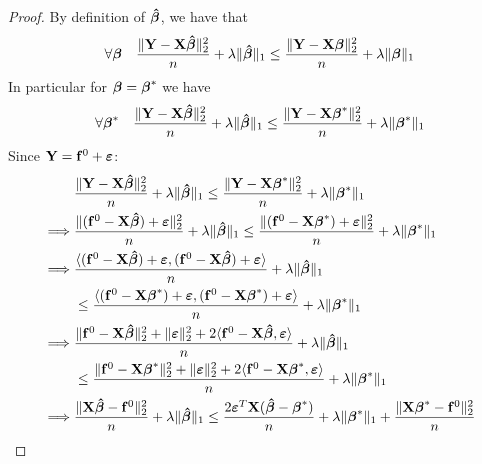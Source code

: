 \begin{proof}
    By definition of $\boldsymbol{\hat{\beta}}$, we have that
    $$
        \forall \boldsymbol{\beta} \quad \frac{\| \mathbf{Y} -\mathbf{X} \boldsymbol{\hat{\beta}} \|_{2}^{2}}{n} + \lambda \| \boldsymbol{\hat{\beta}} \|_{1} \leq \frac{\|\mathbf{Y}-\mathbf{X} \boldsymbol{\beta} \|_{2}^{2}}{n}+\lambda \| \boldsymbol{\beta} \|_{1}
    $$
    In particular for $\boldsymbol{\beta} = \boldsymbol{\beta}^*$ we have
    $$
        \forall \boldsymbol{\beta}^* \quad \frac{\| \mathbf{Y} -\mathbf{X} \boldsymbol{\hat{\beta}} \|_{2}^{2}}{n} + \lambda \| \boldsymbol{\hat{\beta}} \|_{1} \leq \frac{\|\mathbf{Y}-\mathbf{X} \boldsymbol{\beta}^* \|_{2}^{2}}{n}+\lambda \| \boldsymbol{\beta}^* \|_{1}
    $$
    Since $\mathbf{Y} = \mathbf{f}^0 + \boldsymbol{\varepsilon}$:
    \begin{align*}
                 & \frac{\|\mathbf{Y}  - \mathbf{X} \boldsymbol{\hat{\beta}} \|_{2}^{2}}{n} + \lambda \| \boldsymbol{\hat{\beta}}\|_{1} \leq \frac{\| \mathbf{Y}  - \mathbf{X} \boldsymbol{\beta}^* \|_2^2}{n}+\lambda\|\boldsymbol{\beta}^{*}\|_{1}                                                                     \\
        \implies &
        \frac{\| (\mathbf{f}^0 - \mathbf{X} \boldsymbol{\hat{\beta}} ) + \boldsymbol{\varepsilon} \|_{2}^{2}}{n} + \lambda\| \boldsymbol{\hat{\beta}} \|_{1} \leq \frac{ \| (\mathbf{f}^0 - \mathbf{X} \boldsymbol{\beta}^*) + \boldsymbol{\varepsilon} \|_{2}^{2}}{n}+\lambda \| \boldsymbol{\beta}^*\|_{1}                                     \\
        \implies &
        \frac{\langle (\mathbf{f}^0 - \mathbf{X} \boldsymbol{\hat{\beta}} ) + \boldsymbol{\varepsilon}, (\mathbf{f}^0 - \mathbf{X} \boldsymbol{\hat{\beta}} ) + \boldsymbol{\varepsilon} \rangle}{n} + \lambda\| \boldsymbol{\hat{\beta}} \|_{1}                                                                                      \\
                 & \leq \frac{ \langle (\mathbf{f}^0 - \mathbf{X} \boldsymbol{\beta}^*) + \boldsymbol{\varepsilon}, (\mathbf{f}^0 - \mathbf{X} \boldsymbol{\beta}^*) + \boldsymbol{\varepsilon} \rangle}{n}+\lambda \| \boldsymbol{\beta}^*\|_{1}                                                                            \\
        \implies &
        \frac{\|\mathbf{f}^0 - \mathbf{X} \boldsymbol{\hat{\beta}} \|_{2}^{2} + \| \boldsymbol{\varepsilon} \|_{2}^{2} + 2\langle \mathbf{f}^0 - \mathbf{X} \boldsymbol{\hat{\beta}}, \boldsymbol{\varepsilon} \rangle}{n} + \lambda\| \boldsymbol{\hat{\beta}} \|_{1}                                                                \\
                 & \leq \frac{\|\mathbf{f}^0 - \mathbf{X} \boldsymbol{\beta}^* \|_{2}^{2} + \| \boldsymbol{\varepsilon} \|_{2}^{2} + 2\langle \mathbf{f}^0 - \mathbf{X} \boldsymbol{\beta}^*, \boldsymbol{\varepsilon} \rangle}{n}+\lambda \| \boldsymbol{\beta}^*\|_{1}                                                     \\
        \implies &
        \frac{\|\mathbf{X} \boldsymbol{\hat{\beta}} - \mathbf{f}^0 \|_{2}^{2}}{n} + \lambda\| \boldsymbol{\hat{\beta}} \|_{1} \leq \frac{2 \boldsymbol{\varepsilon}^T \mathbf{X} (\boldsymbol{\hat{\beta}} - \boldsymbol{\beta}^*)}{n} + \lambda \| \boldsymbol{\beta}^*\|_{1} + \frac{\|\mathbf{X} \boldsymbol{\beta}^* - \mathbf{f}^0\|_{2}^{2}}{n}               \\
    \end{align*}
\end{proof}

